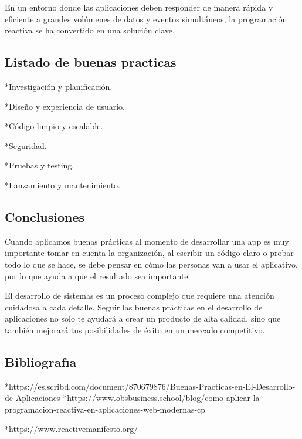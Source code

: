 \documentclass[stu,12pt,floatsintext]{apa7}
\begin{document}
En un entorno donde las aplicaciones deben responder de manera rápida y eficiente a grandes volúmenes de datos y eventos simultáneos, la programación reactiva se ha convertido en una solución clave.

\subsection{Listado de buenas practicas}

*Investigación y planificación.

*Diseño y experiencia de usuario.

*Código limpio y escalable.

*Seguridad.

*Pruebas y testing.

*Lanzamiento y mantenimiento.

\subsection{Conclusiones}

Cuando aplicamos buenas prácticas al momento de desarrollar una app es muy importante tomar en cuenta la organización, al escribir un código claro o probar todo lo que se hace, se debe pensar en cómo las personas van a usar el aplicativo, por lo que ayuda a que el resultado sea importante

El desarrollo de sistemas es un proceso complejo que requiere una atención cuidadosa a cada detalle. Seguir las buenas prácticas en el desarrollo de aplicaciones no solo te ayudará a crear un producto de alta calidad, sino que también mejorará tus posibilidades de éxito en un mercado competitivo. 
\subsection{Bibliografıa}

*https://es.scribd.com/document/870679876/Buenas-Practicas-en-El-Desarrollo-de-Aplicaciones
*https://www.obsbusiness.school/blog/como-aplicar-la-programacion-reactiva-en-aplicaciones-web-modernas-cp

*https://www.reactivemanifesto.org/








\printbibliography
\end{document}
